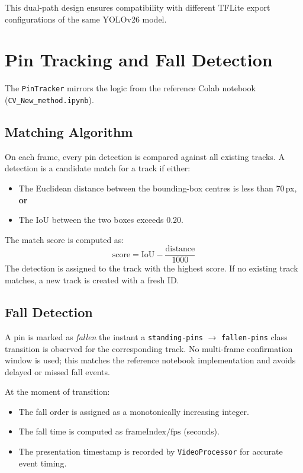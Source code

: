 \documentclass{zc-ust-hw}
\begin{document}
This dual-path design ensures compatibility with different TFLite export configurations of the same YOLOv26 model.

\section{Pin Tracking and Fall Detection}

The \texttt{PinTracker} mirrors the logic from the reference Colab notebook (\texttt{CV\_New\_method.ipynb}).

\subsection{Matching Algorithm}

On each frame, every pin detection is compared against all existing tracks.
A detection is a candidate match for a track if either:
\begin{itemize}
    \item The Euclidean distance between the bounding-box centres is less than 70\,px, \textbf{or}
    \item The IoU between the two boxes exceeds 0.20.
\end{itemize}

The match score is computed as:
\[
    \text{score} = \text{IoU} - \frac{\text{distance}}{1000}
\]
The detection is assigned to the track with the highest score.
If no existing track matches, a new track is created with a fresh ID.

\subsection{Fall Detection}

A pin is marked as \emph{fallen} the instant a \texttt{standing-pins} $\rightarrow$ \texttt{fallen-pins} class transition is observed for the corresponding track.
No multi-frame confirmation window is used; this matches the reference notebook implementation and avoids delayed or missed fall events.

At the moment of transition:
\begin{itemize}
    \item The fall order is assigned as a monotonically increasing integer.
    \item The fall time is computed as $\text{frameIndex} / \text{fps}$ (seconds).
    \item The presentation timestamp is recorded by \texttt{VideoProcessor} for accurate event timing.
\end{itemize}
\end{document}
